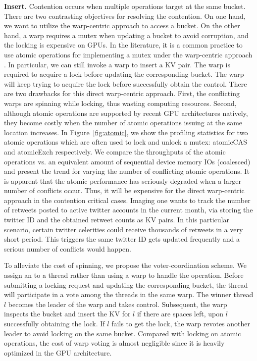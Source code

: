 \vspace{1mm}\noindent\textbf{Insert.} Contention occurs when multiple  operations target at the same bucket. 
There are two contrasting objectives for resolving the contention. On one hand, we want to utilize the warp-centric approach to access a bucket.
On the other hand, a warp requires a mutex when updating a bucket to avoid corruption, and the locking is expensive on GPUs.  
In the literature, it is a common practice to use atomic operations for implementing a mutex under the warp-centric approach \cite{zhang2015mega}. 
In particular, we can still invoke a warp to insert a KV pair. The warp is required to acquire a lock before updating the corresponding bucket. 
The warp will keep trying to acquire the lock before successfully obtain the control. 
There are two drawbacks for this direct warp-centric approach. 
First, the conflicting warps are spinning while locking, thus wasting computing resources.
Second, although atomic operations are supported by recent GPU architectures natively, 
they become costly when the number of atomic operations issuing at the same location increases. 
In Figure~\ref{fig:atomic}, we show the profiling statistics for two atomic operations which are often used to lock and unlock a mutex: atomicCAS and atomicExch respectively. 
We compare the throughputs of the atomic operations vs. an equivalent amount of sequential device memory IOs (coalesced) and present the trend for varying the number of conflicting atomic operations. It is apparent that the atomic performance has seriously degraded when a larger number of conflicts occur. 
Thus, it will be expensive for the direct warp-centric approach in the contention critical cases. 
Imaging one wants to track the number of retweets posted to active twitter accounts in the current month, via storing the twitter ID and the obtained retweet counts as KV pairs. In this particular scenario, certain twitter celerities could receive thousands of retweets in a very short period. 
This triggers the same twitter ID gets updated frequently and a serious number of conflicts would happen. 

To alleviate the cost of spinning, we propose the voter-coordination scheme. 
We assign an  to a thread rather than using a warp to handle the operation. Before submitting a locking request and updating the corresponding bucket, the thread will participate in a vote among the threads in the same warp. 
The winner thread $l$ becomes the leader of the warp and takes control. Subsequent, the warp inspects the bucket and insert the KV for $l$ if there are spaces left, upon $l$ successfully obtaining the lock.
If $l$ fails to get the lock, the warp revotes another leader to avoid locking on the same bucket.
Compared with locking on atomic operations, the cost of warp voting is almost negligible since it is heavily optimized in the GPU architecture.  


